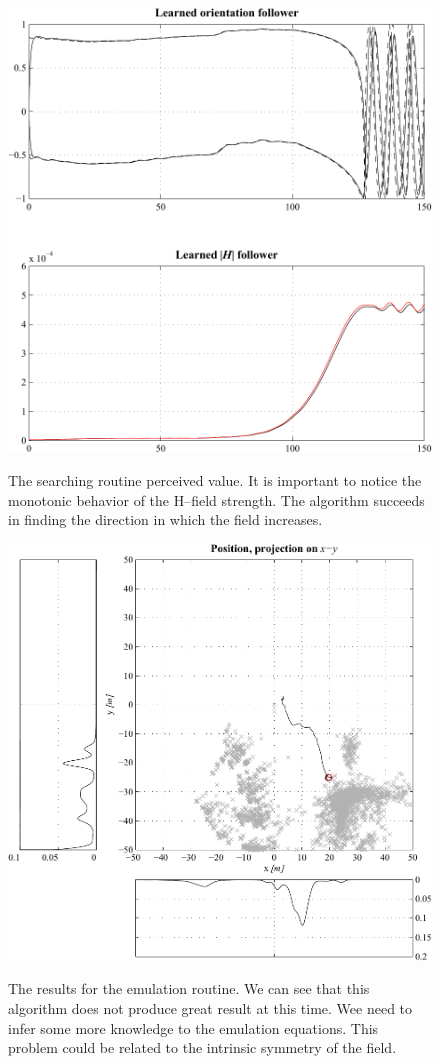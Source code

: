 \begin{figure}[f]
	\centering
	\includegraphics[]{ch4/img/Searching.pdf}
\label{fig:searching}
\caption{The searching routine perceived value. It is important to notice the monotonic behavior of the H--field strength. The algorithm succeeds in finding the direction in which the field increases.}
\end{figure}

\begin{figure}[f]
	\centering
	\includegraphics[]{ch4/img/ParzenWindow.pdf}
\label{fig:parzwin}
\caption{The results for the emulation routine. We can see that this algorithm does not produce great result at this time. Wee need to infer some more knowledge to the emulation equations. This problem could be related to the intrinsic symmetry of the field.}
\end{figure}

